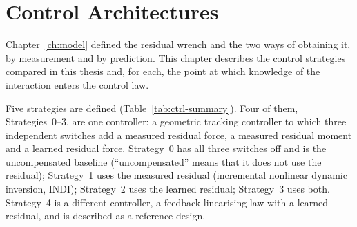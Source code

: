 %
%
%
%

\chapter{Control Architectures}
\label{ch:control}

Chapter~\ref{ch:model} defined the residual wrench and the two ways of obtaining it, by measurement
and by prediction. This chapter describes the control strategies compared in this thesis and, for
each, the point at which knowledge of the interaction enters the control law.

Five strategies are defined (Table~\ref{tab:ctrl-summary}). Four of them, Strategies~0--3, are one
controller: a geometric tracking controller to which three independent switches add a measured
residual force, a measured residual moment and a learned residual force. Strategy~0 has all three
switches off and is the uncompensated baseline (``uncompensated'' means that it does not use the
residual); Strategy~1 uses the measured residual (incremental nonlinear dynamic inversion, INDI);
Strategy~2 uses the learned residual; Strategy~3 uses both. Strategy~4 is a different controller, a
feedback-linearising law with a learned residual, and is described as a reference design.

